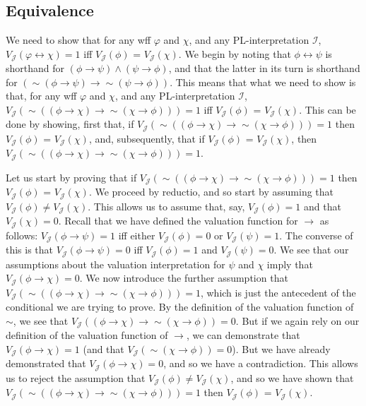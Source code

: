 \documentclass[sloppy, journal, git, bytitle]{humapap}
\begin{document}
\subsection{Equivalence}
We need to show that for any wff $\varphi$ and $\chi$, and any PL-interpretation $\mathcal{I}$, $V\mathcal{_J}(\varphi\leftrightarrow\chi)=1$ iff $V\mathcal{_J}(\phi)$ = $V\mathcal{_J}(\chi)$. We begin by noting that $\phi\leftrightarrow\psi$ is shorthand for $(\phi\rightarrow\psi)\wedge(\psi\rightarrow\phi)$, and that the latter in its turn is shorthand for $(\sim(\phi\rightarrow\psi)\rightarrow\sim(\psi\rightarrow\phi))$.  
This means that what we need to show is that, for any wff $\varphi$ and $\chi$, and any PL-interpretation $\mathcal{I}$, $V\mathcal{_J}(\sim((\phi\rightarrow\chi)\rightarrow\sim(\chi\rightarrow\phi)))=1$ iff $V\mathcal{_J}(\phi)$ = $V\mathcal{_J}(\chi)$. This can be done by showing, first that, if $V\mathcal{_J}(\sim((\phi\rightarrow\chi)\rightarrow\sim(\chi\rightarrow\phi)))=1$ then $V\mathcal{_J}(\phi)$ = $V\mathcal{_J}(\chi)$, and, subsequently, that if $V\mathcal{_J}(\phi)$ = $V\mathcal{_J}(\chi)$, then $V\mathcal{_J}(\sim((\phi\rightarrow\chi)\rightarrow\sim(\chi\rightarrow\phi)))=1$. 

Let us start by proving that if $V\mathcal{_J}(\sim((\phi\rightarrow\chi)\rightarrow\sim(\chi\rightarrow\phi)))=1$ then $V\mathcal{_J}(\phi)$ = $V\mathcal{_J}(\chi)$. We proceed by reductio, and so start by assuming that $V\mathcal{_J}(\phi) \neq  V\mathcal{_J}(\chi)$. This allows us to assume that, say, $V\mathcal{_J}(\phi)=1$ and that $V\mathcal{_J}(\chi)=0$. Recall that we have defined the valuation function for $\rightarrow$ as follows: $V\mathcal{_J}(\phi\rightarrow\psi)=1$ iff either $V\mathcal{_J}(\phi)=0$ or $V\mathcal{_J}(\psi)=1$. The converse of this is that $V\mathcal{_J}(\phi\rightarrow\psi)=0$ iff $V\mathcal{_J}(\phi)=1$ and $V\mathcal{_J}(\psi)=0$. We see that our assumptions about the valuation interpretation for $\psi$ and $\chi$ imply that $V\mathcal{_J}(\phi\rightarrow\chi)=0$. We now introduce the further assumption that $V\mathcal{_J}(\sim((\phi\rightarrow\chi)\rightarrow\sim(\chi\rightarrow\phi)))=1$, which is just the antecedent of the conditional we are trying to prove. By the definition of the valuation function of $\sim$, we see that $V\mathcal{_J}((\phi\rightarrow\chi)\rightarrow\sim(\chi\rightarrow\phi))=0$. But if we again rely on our definition of the valuation function of $\rightarrow$, we can demonstrate that $V\mathcal{_J}(\phi\rightarrow\chi)=1$ (and that $V\mathcal{_J}(\sim(\chi\rightarrow\phi))=0$). But we have already demonstrated that $V\mathcal{_J}(\phi\rightarrow\chi)=0$, and so we have a contradiction. This allows us to reject the assumption that $V\mathcal{_J}(\phi) \neq  V\mathcal{_J}(\chi)$, and so we have shown that $V\mathcal{_J}(\sim((\phi\rightarrow\chi)\rightarrow\sim(\chi\rightarrow\phi)))=1$ then $V\mathcal{_J}(\phi)$ = $V\mathcal{_J}(\chi)$.
\end{document}
